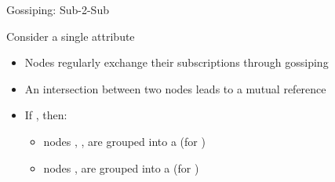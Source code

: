 \begin{slide}{Gossiping: Sub-2-Sub}
  \begin{centerfig}
  \end{centerfig}
  \begin{block}{Consider a single attribute}
    \begin{itemize}
    \item Nodes regularly exchange their subscriptions through gossiping
    \item An intersection between two nodes leads to a mutual reference
    \item If  
      , then:
      \begin{itemize}
      \item nodes , ,  are grouped into a  (for )
      \item nodes ,  are grouped into a  (for
        )
      \end{itemize}
    \end{itemize}
  \end{block}
  
\end{slide}

